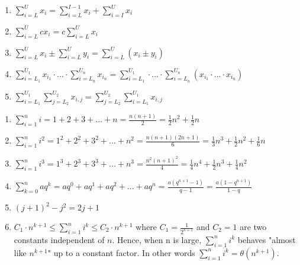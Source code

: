 \begin{enumerate}
    \item $\sum_{i=L}^Ux_i=\sum_{i=L}^{I-1}x_i+\sum_{i=I}^Ux_i$
    \item $\sum_{i=L}^Ucx_i=c\sum_{i=L}^Ux_i$
    \item $\sum_{i=L}^Ux_i\pm\sum_{i=L}^Uy_i=\sum_{i=L}^U(x_i\pm y_i)$
    \item $\sum_{i=L_1}^{U_1}x_{i_1}\cdot ... \cdot \sum_{i=L_n}^{U_n}x_{i_n}=\sum_{i=L_1}^{U_1}\cdot ... \cdot \sum_{i=L_n}^{U_n}(x_{i_1}\cdot ...\cdot x_{i_n})$
    \item $\sum_{i=L_1}^{U_1}\sum_{j=L_2}^{U_2}x_{i,j}=\sum_{j=L_2}^{U_2}\sum_{i=L_1}^{U_1}x_{i,j}$
\end{enumerate}

\begin{enumerate}
    \item $\sum_{i=1}^{n} i = 1 + 2 + 3 + ... + n = \frac{n(n+1)}{2} = \frac{1}{2}n^2 + \frac{1}{2}n$
    \item $\sum_{i=1}^{n} i^2 = 1^2 + 2^2 + 3^2 + ... + n^2 = \frac{n(n+1)(2n + 1)}{6} = \frac{1}{3}n^3 + \frac{1}{2}n^2 + \frac{1}{6}n$
    \item $\sum_{i=1}^{n} i^3 = 1^3 + 2^3 + 3^3 + ... + n^3 = \frac{n^2(n+1)^2}{4} = \frac{1}{4}n^4 + \frac{1}{2}n^3 + \frac{1}{4}n^2$
    \item $\sum_{k=0}^{n} aq^k = aq^0 + aq^1 + aq^2 + ... + aq^n = \frac{a(q^{n+1}-1)}{q-1}=\frac{a(1-q^{n+1})}{1-q}$
    \item $(j+1)^2 - j^2 = 2j + 1$
    \item $C_1 \cdot n^{k+1} \leq \sum_{i=1}^{n} i^k \leq C_2 \cdot n^{k+1}$ where $C_1 = \frac{1}{2^{k+1}}$ and $C_2 = 1$ are two constants independent of $n$. Hence, when n is large, $\sum_{i=1}^n i^k$ behaves "almost like $n^{k+1}$" up to a constant factor. In other words $\sum_{i=1}^n i^k = \theta (n^{k+1})$.
\end{enumerate}



